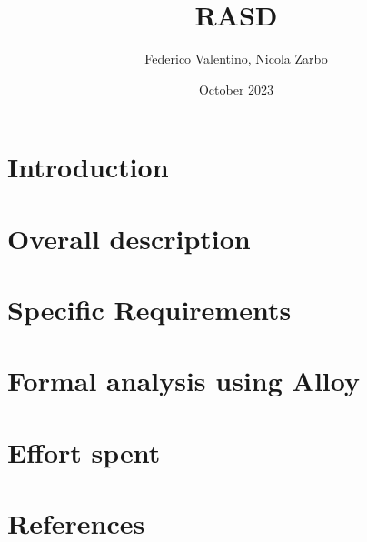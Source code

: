 \documentclass[twoside]{book}
\begin{document}
\title{RASD}
\author{Federico Valentino, Nicola Zarbo }
\date{October 2023}


\maketitle
\newpage
\setcounter{page}{1}

\tableofcontents %
\cleardoublepage

\chapter{Introduction}

\newpage

\chapter{Overall description}

\newpage

\chapter{Specific Requirements}

\newpage

\chapter{Formal analysis using Alloy}

\newpage

\chapter{Effort spent}

\newpage

\chapter{References}

\end{document}

